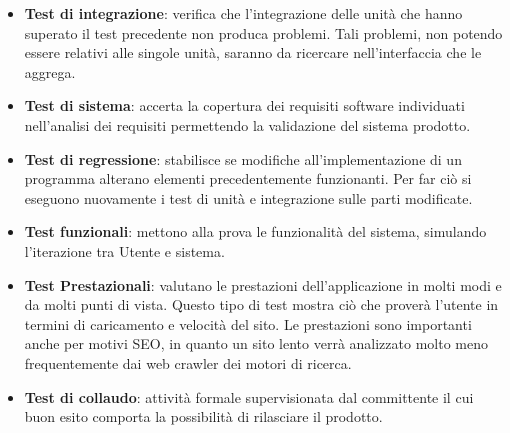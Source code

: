 \begin{itemize}
\begin{itemize}
\item \textbf{Test di integrazione}: verifica che l'integrazione delle unità che hanno superato il test precedente non produca problemi. Tali problemi, non potendo essere relativi alle singole unità, saranno da ricercare nell'interfaccia che le aggrega.

\item \textbf{Test di sistema}: accerta la copertura dei requisiti software individuati nell'analisi dei requisiti permettendo la validazione del sistema prodotto.

\item \textbf{Test di regressione}: stabilisce se modifiche all'implementazione di un programma alterano elementi precedentemente funzionanti. Per far ciò si eseguono nuovamente i test di unità e integrazione sulle parti modificate.

\item \textbf{Test funzionali}: mettono alla prova le funzionalità del sistema, simulando l'iterazione tra Utente e sistema.

\item \textbf{Test Prestazionali}: valutano le prestazioni dell'applicazione in molti modi e da molti punti di vista. Questo tipo di test mostra ciò che proverà l'utente in termini di caricamento e velocità del sito. Le prestazioni sono importanti anche per motivi SEO, in quanto un sito lento verrà analizzato molto meno frequentemente dai web crawler dei motori di ricerca.

\item \textbf{Test di collaudo}: attività formale supervisionata dal committente il cui buon esito comporta la possibilità di rilasciare il prodotto.
\end{itemize}
\end{itemize}
